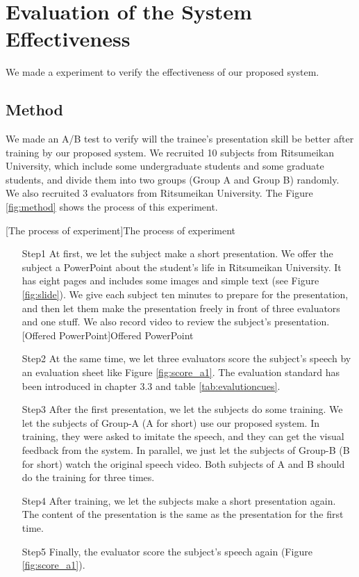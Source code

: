 \newpage

\section{Evaluation of the System Effectiveness}%
\label{sec:evaluation_of_the_system_effectiveness}
\par  We made a experiment to verify the effectiveness of our proposed system.

\subsection*{Method}
\par We made an A/B test to verify will the trainee's presentation skill be better after training by our proposed system. We recruited 10 subjects from Ritsumeikan University, which include some undergraduate students and some graduate students, and divide them into two groups (Group A and Group B) randomly. We also recruited 3 evaluators from Ritsumeikan University. The Figure \ref{fig:method} shows the process of this experiment.       

[The process of experiment]{The process of experiment}
\begin{itemize}
 \item [Step1] At first, we let the subject make a short presentation. We offer the subject a PowerPoint about the student's life in Ritsumeikan University. It has eight pages and includes some images and simple text (see Figure \ref{fig:slide}). We give each subject ten minutes to prepare for the presentation, and then let them make the presentation freely in front of three evaluators and one stuff. We also record video to review the subject's presentation.
  [Offered PowerPoint]{Offered PowerPoint} 
  \item [Step2] At the same time, we let three evaluators score the subject's speech by an evaluation sheet like Figure \ref{fig:score_a1}. The evaluation standard has been introduced in chapter 3.3 and table \ref{tab:evalutioncues}.
  \item [Step3] After the first presentation, we let the subjects do some training. We let the subjects of Group-A (A for short) use our proposed system. In training, they were asked to imitate the speech, and they can get the visual feedback from the system. In parallel, we just let the subjects of Group-B (B for short) watch the original speech video. Both subjects of A and B should do the training for three times.
  \item [Step4] After training, we let the subjects make a short presentation again. The content of the presentation is the same as the presentation for the first time.
  \item [Step5] Finally, the evaluator score the subject's speech again (Figure \ref{fig:score_a1}).
\end{itemize}

